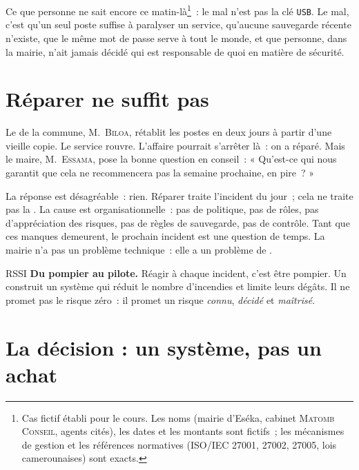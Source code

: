 \medskip
Ce que personne ne sait encore ce matin-là\footnote{Cas fictif établi pour le
cours. Les noms (mairie d'Eséka, cabinet \textsc{Matomb Conseil}, agents
cités), les dates et les montants sont fictifs~; les mécanismes de gestion et
les références normatives (ISO/IEC 27001, 27002, 27005, lois camerounaises)
sont exacts.}~: le mal n'est pas la clé \texttt{USB}. Le mal, c'est qu'un seul
poste suffise à paralyser un service, qu'aucune sauvegarde récente n'existe,
que le même mot de passe serve à tout le monde, et que personne, dans la
mairie, n'ait jamais décidé qui est responsable de quoi en matière de
sécurité.

\section{Réparer ne suffit pas}
\label{sec:p00-reparer}

Le  de la commune, M.~\textsc{Biloa}, rétablit les postes en deux
jours à partir d'une vieille copie. Le service rouvre. L'affaire pourrait
s'arrêter là~: on a réparé. Mais le maire, M.~\textsc{Essama}, pose la bonne
question en conseil~: « Qu'est-ce qui nous garantit que cela ne
recommencera pas la semaine prochaine, en pire~? »

\medskip
La réponse est désagréable~: rien. Réparer traite l'incident du jour~; cela ne
traite pas la . La cause est organisationnelle~: pas de
politique, pas de rôles, pas d'appréciation des risques, pas de règles de
sauvegarde, pas de contrôle. Tant que ces manques demeurent, le prochain
incident est une question de temps. La mairie n'a pas un problème technique~:
elle a un problème de .

\begin{boxmetier}{RSSI}
\textbf{Du pompier au pilote.} Réagir à chaque incident, c'est être pompier.
Un  construit un système qui réduit le nombre d'incendies et
limite leurs dégâts. Il ne promet pas le risque zéro~: il promet un risque
\emph{connu}, \emph{décidé} et \emph{maîtrisé}.
\end{boxmetier}

\section{La décision : un système, pas un achat}
\label{sec:p00-decision}

